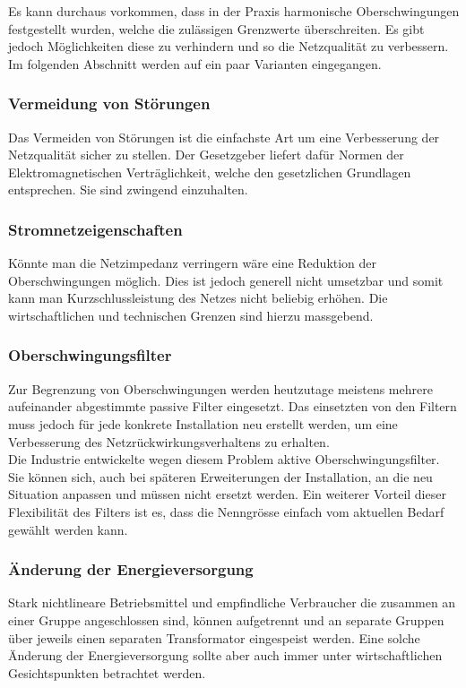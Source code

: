 Es kann durchaus vorkommen, dass in der Praxis harmonische Oberschwingungen festgestellt wurden, welche die zulässigen Grenzwerte überschreiten. Es gibt jedoch Möglichkeiten diese zu verhindern und so die Netzqualität zu verbessern. Im folgenden Abschnitt werden auf ein paar Varianten eingegangen.

\subsubsection{Vermeidung von Störungen}
Das Vermeiden von Störungen ist die einfachste Art um eine Verbesserung der Netzqualität sicher zu stellen. Der Gesetzgeber liefert dafür Normen der Elektromagnetischen Verträglichkeit, welche den gesetzlichen Grundlagen entsprechen. Sie sind zwingend einzuhalten.
\subsubsection{Stromnetzeigenschaften}
Könnte man die Netzimpedanz verringern wäre eine Reduktion der Oberschwingungen möglich. Dies ist jedoch generell nicht umsetzbar und somit kann man Kurzschlussleistung des Netzes nicht beliebig erhöhen. Die wirtschaftlichen und technischen Grenzen sind hierzu massgebend.  


\subsubsection{Oberschwingungsfilter}

Zur Begrenzung von Oberschwingungen werden heutzutage  meistens mehrere aufeinander abgestimmte passive Filter eingesetzt. Das einsetzten von den Filtern muss jedoch für jede konkrete Installation neu erstellt werden, um eine Verbesserung des Netzrückwirkungsverhaltens zu erhalten.\\
Die Industrie entwickelte wegen diesem Problem aktive Oberschwingungsfilter. Sie können sich, auch bei späteren Erweiterungen der Installation, an die neu Situation anpassen und müssen nicht ersetzt werden. Ein weiterer Vorteil dieser Flexibilität des Filters ist es, dass die Nenngrösse einfach vom aktuellen Bedarf gewählt werden kann.     

\subsubsection{Änderung der Energieversorgung}

Stark nichtlineare Betriebsmittel und empfindliche Verbraucher die zusammen an einer Gruppe angeschlossen sind, können aufgetrennt und an separate Gruppen über jeweils einen separaten Transformator eingespeist werden. Eine solche Änderung der Energieversorgung sollte aber auch immer unter wirtschaftlichen Gesichtspunkten betrachtet werden.

